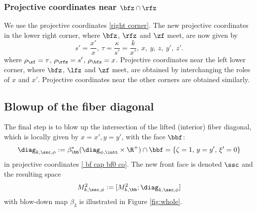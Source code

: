 \subsubsection*{Projective coordinates near $\bfz \cap \rfz$}
We use the projective coordinates \eqref{right corner}. The new projective
coordinates in the lower right corner, where $\bfz$, $\rfz$ and $\zf$ meet, are now given by
\begin{equation}
s' = \frac{x'}{x}, \ \tau = \frac{\kappa}{s'} = \frac{k}{x'}, \ x, \ y, \ z, \ y', \ z'.
\end{equation}
where $\rho_{\zf} = \tau$, $\rho_{\rfz} = s'$, $\rho_{\bfz} = x$. Projective
coordinates near the left lower corner, where $\bfz$, $\lfz$ and $\zf$ meet,
are obtained by interchanging the roles of $x$ and $x'$. Projective coordinates near the other
corners are obtained similarly.

\subsection{Blowup of the fiber diagonal} \label{subsec:bup fiber diag}
The final step is to blow up the intersection of the lifted (interior) fiber diagonal, which is locally given by $x=x',y=y'$, with the face $\bbf$:
\begin{equation}
\label{eqn:def diag k sc phi}
\diag_{k,\ssc,\phi} := \beta_\bb^*(\diag_{\phi,\intt}\times\R^+) \cap \bbf = \{\zeta=1, \, y = y', \, \xi'=0\}
\end{equation}
in projective coordinates
\eqref{ bf cap bf0 co}.
The new front face is denoted $\ssc$ and the resulting space
\[
M^{2}_{k, \ssc,\phi}:= [M^{2}_{k,\bb} ; \diag_{k,\ssc,\phi}]
\]
with blow-down map $\beta_3$
is illustrated in Figure \ref{fig:whole}.

